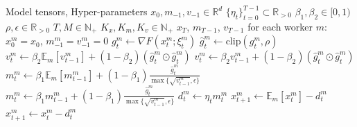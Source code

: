 \documentclass{article}
\begin{document}
\begin{algorithm}[h]
\caption{Neuron\_SP-ADOPT}
\label{alg:desloc_adopt}
\begin{algorithmic}[1]
\REQUIRE Model tensors, Hyper-parameters
\STATE $x_0, m_{-1}, v_{-1} \in \mathbb{R}^d$ 
\STATE $\{\eta_t\}_{t=0}^{T-1} \subset \mathbb{R}_{>0}$ 
\STATE $\beta_1, \beta_2 \in [0,1)$ 
\STATE $\rho, \epsilon \in \mathbb{R}_{>0}$ 
\STATE $T, M \in \mathbb{N}_+$ 
\STATE $K_x, K_m, K_v \in \mathbb{N}_+$ 
\ENSURE $x_T$, $m_{T-1}$, $v_{T-1}$
\STATE for each worker $m$: $x^m_0 = x_0$, $m^m_{-1} = v^m_{-1} = 0$ 
        \STATE $g^m_t \gets \nabla F(x^m_t; \xi^m_t)$ 
        \STATE $\hat{g}^m_t \gets \text{clip}(g^m_t, \rho)$ 
            \STATE $v^m_t \gets \beta_2 \mathbb{E}_m[v^m_{t-1}] + (1 - \beta_2)(\hat{g}^m_t \odot \hat{g}^m_t)$
        \ELSE
            \STATE $v^m_t \gets \beta_2 v^m_{t-1} + (1 - \beta_2)(\hat{g}^m_t \odot \hat{g}^m_t)$
        \ENDIF
            \STATE $m^m_t \gets \beta_1 \mathbb{E}_m[m^m_{t-1}] + (1 - \beta_1) \frac{\hat{g}^m_t}{\max\{\sqrt{v^m_{t-1}}, \epsilon\}}$
        \ELSE
            \STATE $m^m_t \gets \beta_1 m^m_{t-1} + (1 - \beta_1) \frac{\hat{g}^m_t}{\max\{\sqrt{v^m_{t-1}}, \epsilon\}}$ 
        \ENDIF
        \STATE $d^m_t \gets \eta_t m^m_t$
            \STATE $x^m_{t+1} \gets \mathbb{E}_m[x^m_t] - d^m_t$
        \ELSE
            \STATE $x^m_{t+1} \gets x^m_t - d^m_t$
        \ENDIF
    \ENDFOR
\ENDFOR
\end{algorithmic}
\end{algorithm}
\end{document}
